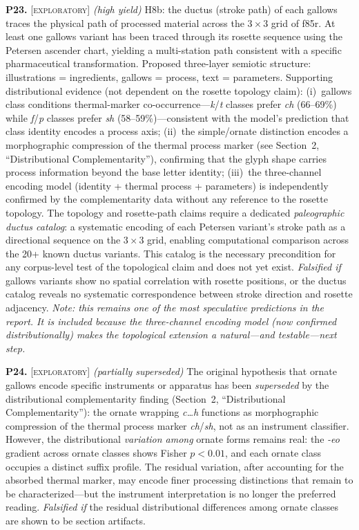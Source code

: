 \documentclass[11pt,a4paper]{article}
\newcommand{\exploratory}{\textsc{[exploratory]}}
\newcommand{\falsmark}{\textit{Falsified if}}
\begin{document}
\medskip

\noindent\textbf{P23.} \exploratory{} \textit{(high yield)} H8b: the ductus (stroke path) of each gallows traces the physical path of processed material across the $3 \times 3$ grid of f85r. At least one gallows variant has been traced through its rosette sequence using the Petersen ascender chart, yielding a multi-station path consistent with a specific pharmaceutical transformation. Proposed three-layer semiotic structure: illustrations = ingredients, gallows = process, text = parameters. Supporting distributional evidence (not dependent on the rosette topology claim): (i)~gallows class conditions thermal-marker co-occurrence---\textit{k}/\textit{t} classes prefer \textit{ch} (66--69\%) while \textit{f}/\textit{p} classes prefer \textit{sh} (58--59\%)---consistent with the model's prediction that class identity encodes a process axis; (ii)~the simple/ornate distinction encodes a morphographic compression of the thermal process marker (see Section~2, ``Distributional Complementarity''), confirming that the glyph shape carries process information beyond the base letter identity; (iii)~the three-channel encoding model (identity + thermal process + parameters) is independently confirmed by the complementarity data without any reference to the rosette topology. The topology and rosette-path claims require a dedicated \textit{paleographic ductus catalog}: a systematic encoding of each Petersen variant's stroke path as a directional sequence on the $3 \times 3$ grid, enabling computational comparison across the 20+ known ductus variants. This catalog is the necessary precondition for any corpus-level test of the topological claim and does not yet exist. \falsmark{} gallows variants show no spatial correlation with rosette positions, or the ductus catalog reveals no systematic correspondence between stroke direction and rosette adjacency. \textit{Note: this remains one of the most speculative predictions in the report. It is included because the three-channel encoding model (now confirmed distributionally) makes the topological extension a natural---and testable---next step.}

\medskip

\noindent\textbf{P24.} \exploratory{} \textit{(partially superseded)} The original hypothesis that ornate gallows encode specific instruments or apparatus has been \textit{superseded} by the distributional complementarity finding (Section~2, ``Distributional Complementarity''): the ornate wrapping \textit{c\ldots h} functions as morphographic compression of the thermal process marker \textit{ch}/\textit{sh}, not as an instrument classifier. However, the distributional \textit{variation among} ornate forms remains real: the \textit{-eo} gradient across ornate classes shows Fisher $p < 0.01$, and each ornate class occupies a distinct suffix profile. The residual variation, after accounting for the absorbed thermal marker, may encode finer processing distinctions that remain to be characterized---but the instrument interpretation is no longer the preferred reading. \falsmark{} the residual distributional differences among ornate classes are shown to be section artifacts.
\end{document}
